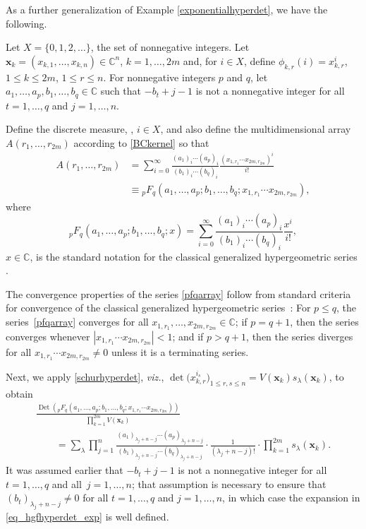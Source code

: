 \documentclass[pdftex]{sigma}
\numberwithin{equation}{section}
\def\C{{\mathbb C}}
\def\Det{\operatorname{Det}}
\def\xx{\boldsymbol{x}}
\begin{document}
As a further generalization of Example \ref{exponentialhyperdet}, we have the following.

\begin{Example}
\label{hgfhyperdet}
Let $X = \{0,1,2,\dots\}$, the set of nonnegative integers. Let $\xx_k = (x_{k,1},\dots,x_{k,n}) \in \C^n$, $k=1,\dots,2m$ and, for $i \in X$, define $\phi_{k,r}(i) = x_{k,r}^i$, $1 \le k \le 2m$, $1 \le r \le n$. For nonnegative integers $p$ and $q$, let $a_1,\dots,a_p,b_1,\dots,b_q \in \C$ such that $-b_t+j-1$ is not a nonnegative integer for all $t=1,\dots,q$ and $j=1,\dots,n$.

Define the discrete measure,
,
$i \in X$, and also define the multidimensional array $A(r_1,\dots,r_{2m})$ according to \eqref{BCkernel} so that
\begin{align}
A(r_1,\dots,r_{2m}) & = \sum_{i=0}^\infty \frac{(a_1)_i \cdots (a_p)_i}{(b_1)_i \cdots (b_q)_i} \frac{(x_{1,r_1} \cdots x_{2m,r_{2m}})^i}{i!} \nonumber\\
& \equiv {}_pF_q(a_1,\dots,a_p;b_1,\dots,b_q;x_{1,r_1} \cdots x_{2m,r_{2m}}),\label{pfqarray}
\end{align}
where
\begin{equation}
\label{classicalargpfq}
{}_pF_q(a_1,\dots,a_p;b_1,\dots,b_q;x) = \sum_{i=0}^\infty \frac{(a_1)_i \cdots (a_p)_i}{(b_1)_i \cdots (b_q)_i} \frac{x^i}{i!},
\end{equation}
$x \in \C$, is the standard notation for the classical generalized hypergeometric series \cite{andrews}.

The convergence properties of the series \eqref{pfqarray} follow from standard criteria for convergence of the classical generalized hypergeometric series~\cite[Theorem 2.1.1]{andrews}: For $p \le q$, the series~\eqref{pfqarray} converges for all $x_{1,r_1},\dots,x_{2m,r_{2m}} \in \C$; if $p = q+1$, then the series converges whenever $|x_{1,r_1} \cdots x_{2m,r_{2m}}| < 1$; and if $p > q+1$, then the series diverges for all $x_{1,r_1} \cdots x_{2m,r_{2m}} \neq 0$ unless it is a terminating series.

Next, we apply \eqref{schurhyperdet}, {\it viz.},
$
\det\bigl(x_{k,r}^{i_s}\bigr)_{1\le r,s\le n} = V(\xx_k) s_\lambda(\xx_k)$,
to obtain
\begin{gather}
\frac{\Det({}_pF_q(a_1,\dots,a_p;b_1,\dots,b_q;x_{1,r_1} \cdots x_{2m,r_{2m}}))}{\prod_{k=1}^{2m} V(\xx_k)}\nonumber \\
\qquad= \sum_\lambda \prod_{j=1}^n \frac{(a_1)_{\lambda_j+n-j} \cdots (a_p)_{\lambda_j+n-j}}{(b_1)_{\lambda_j+n-j} \cdots (b_q)_{\lambda_j+n-j}} \cdot \frac{1}{(\lambda_j+n-j)!} \cdot \prod_{k=1}^{2m} s_\lambda(\xx_k).\label{eq_hgfhyperdet_exp}
\end{gather}
It was assumed earlier that $-b_t+j-1$ is not a nonnegative integer for all $t=1,\dots,q$ and all~${j=1,\dots,n}$; that assumption is necessary to ensure that $(b_t)_{\lambda_j+n-j} \neq 0$ for all $t=1,\dots,q$ and $j=1,\dots,n$, in which case the expansion in \eqref{eq_hgfhyperdet_exp} is well defined.


\end{Example}
\end{document}
